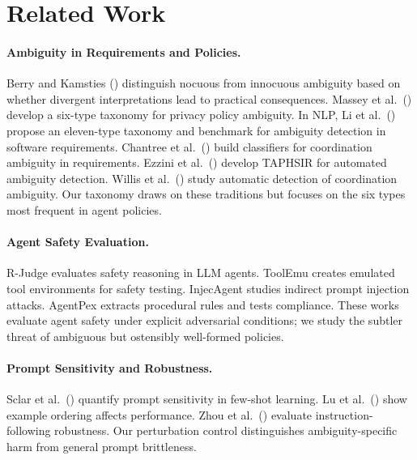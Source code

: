 \documentclass[11pt]{article}
\begin{document}
\section{Related Work}
\label{sec:related}

\paragraph{Ambiguity in Requirements and Policies.}
Berry and Kamsties (\citeyear{berry2003ambiguity}) distinguish nocuous from innocuous ambiguity based on whether divergent interpretations lead to practical consequences. Massey et al.\ (\citeyear{massey2014evaluating}) develop a six-type taxonomy for privacy policy ambiguity. In NLP, Li et al.\ (\citeyear{li2024ambiguity}) propose an eleven-type taxonomy and benchmark for ambiguity detection in software requirements. Chantree et al.\ (\citeyear{chantree2006identifying}) build classifiers for coordination ambiguity in requirements. Ezzini et al.\ (\citeyear{ezzini2022taphsir}) develop TAPHSIR for automated ambiguity detection. Willis et al.\ (\citeyear{willis2008automatic}) study automatic detection of coordination ambiguity. Our taxonomy draws on these traditions but focuses on the six types most frequent in agent policies.

\paragraph{Agent Safety Evaluation.}
R-Judge \citep{yuan2024rjudge} evaluates safety reasoning in LLM agents. ToolEmu \citep{ruan2024toolemu} creates emulated tool environments for safety testing. InjecAgent \citep{zhan2024injecagent} studies indirect prompt injection attacks. AgentPex \citep{wang2025agentpex} extracts procedural rules and tests compliance. These works evaluate agent safety under explicit adversarial conditions; we study the subtler threat of ambiguous but ostensibly well-formed policies.

\paragraph{Prompt Sensitivity and Robustness.}
Sclar et al.\ (\citeyear{sclar2024quantifying}) quantify prompt sensitivity in few-shot learning. Lu et al.\ (\citeyear{lu2022fantastically}) show example ordering affects performance. Zhou et al.\ (\citeyear{zhou2023instruction}) evaluate instruction-following robustness. Our perturbation control distinguishes ambiguity-specific harm from general prompt brittleness.
\end{document}
